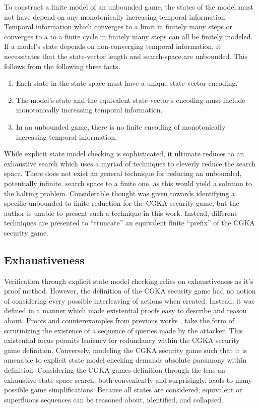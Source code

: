 To construct a finite model of an unbounded game, the states of the model must not have depend on any monotonically increasing temporal information.
Temporal information which converges to a limit in finitely many steps or converges to a to a finite cycle in finitely many steps can all be finitely modeled.
If a model's state depends on non-converging temporal information, it necessitates that the state-vector length and search-space are unbounded.
This follows from the following three facts.

\begin{enumerate}
\def\labelenumi{\arabic{enumi}.}
\item
  Each state in the state-space must have a unique state-vector encoding.
\item
  The model's state and the equivalent state-vector's encoding must include monotonically increasing temporal information.
\item
  In an unbounded game, there is no finite encoding of monotonically increasing temporal information.
\end{enumerate}

While explicit state model checking is sophisticated, it ultimate reduces to an exhaustive search which uses a myriad of techniques to cleverly reduce the search space.
There does not exist an general technique for reducing an unbounded, potentially infinite, search space to a finite one, as this would yield a solution to the halting problem.
Considerable thought was given towards identifying a specific unbounded-to-finite reduction for the CGKA security game, but the author is unable to present such a technique in this work.
Instead, different techniques are presented to ``truncate'' an equivalent finite ``prefix'' of the CGKA security game.

\hypertarget{exhaustiveness}{%
\subsection{Exhaustiveness}\label{exhaustiveness}}

Verification through explicit state model checking relies on exhaustiveness as it's proof method.
However, the definition of the CGKA security game had no notion of considering every possible interleaving of actions when created.
Instead, it was defined in a manner which made existential proofs easy to describe and reason about.
Proofs and counterexamples from previous works \autocite{alwen2019double}, \autocite{alwen2020security} take the form of scrutinizing the existence of a sequence of queries made by the attacker.
This existential focus permits leniency for redundancy within the CGKA security game definition.
Conversely, modeling the CGKA security game such that it is amenable to explicit state model checking demands absolute parsimony within definition.
Considering the CGKA games definition through the lens an exhaustive state-space search, both conveniently and surprisingly, leads to many possible game simplifications.
Because all states are considered, equivalent or superfluous sequences can be reasoned about, identified, and collapsed.

